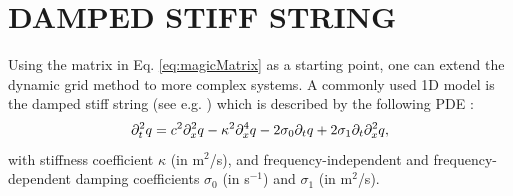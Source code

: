 \documentclass[fleqn]{jaes}
\begin{document}

\section{DAMPED STIFF STRING}\label{sec:stiffString}
Using the matrix in Eq. \eqref{eq:magicMatrix} as a starting point, one can extend the dynamic grid method to more complex systems. A commonly used 1D model is the damped stiff string (see e.g. \cite{Webb2015, Willemsen2019}) which is described by the following PDE \cite{Bensa2003}:
\begin{equation}\label{eq:stiffString}
    \ptt q = c^2 \pxx q - \kappa^2 \pxxxx q - 2\sigma_0\pt q + 2\sigma_1\pt\pxx q,
\end{equation} 
with stiffness coefficient $\kappa$ (in m$^2$/s), and frequency-independent and frequency-dependent damping coefficients $\sigma_0$ (in s$^{-1}$) and $\sigma_1$ (in m$^2$/s).
\end{document}
